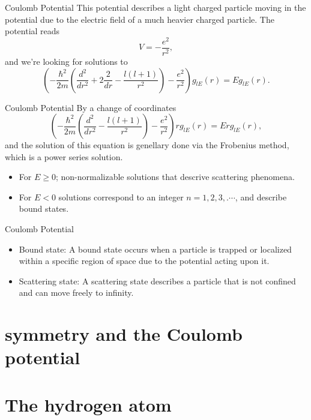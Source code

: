\documentclass[12pt]{beamer}
\begin{document}
\begin{frame}{Coulomb Potential}
This potential describes a light charged particle moving in the potential due to the electric field of a much heavier charged particle. The potential reads
\begin{displaymath}
  V = -\frac{e^2}{r^2},
\end{displaymath}
and we're looking for solutions to 
\begin{displaymath}
  \left(-\frac{\hbar^2}{2m} \left( \frac{d^2}{dr^2} +2\frac{2}{dr} - \frac{l(l+1)}{r^2} \right) -\frac{e^2}{r^2} \right)g_{lE}(r) = Eg_{lE}(r).
\end{displaymath}
\end{frame}

\begin{frame}{Coulomb Potential}
By a change of coordinates
\begin{displaymath}
\left(-\frac{\hbar^2}{2m}\left( \frac{d^2}{dr^2} - \frac{l(l+1)}{r^2}\right) - \frac{e^2}{r^2} \right)rg_{lE}(r) =Erg_{lE}(r),
\end{displaymath}
and the solution of this equation is genellary done via the Frobenius method, which is a power series solution.
\begin{itemize}
	\item For $E\geq 0$; non-normalizable solutions that descrive scattering phenomena.
	\item For $E<0$ solutions correspond to an integer $n=1,2,3,.\cdots$, and describe bound states.
\end{itemize}
\end{frame}

\begin{frame}{Coulomb Potential}
\begin{itemize}
	\item Bound state: A bound state occurs when a particle is trapped or localized within a specific region of space due to the potential acting upon it.
	\item Scattering state: A scattering state describes a particle that is not confined and can move freely to infinity.
\end{itemize}
	
\end{frame}
\section[$\mathfrak{so}(4)$ symmetry and the Coulomb potential]{symmetry and the Coulomb potential}

\section[The hydrogen atom]{The hydrogen atom}
\end{document}
